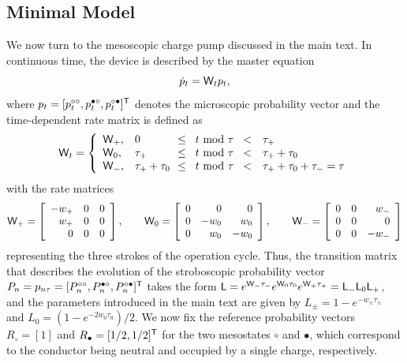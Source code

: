 \documentclass[aps,prl,reprint]{revtex4-2}
\begin{document}
\subsection{Minimal Model}

We now turn to the mesoscopic charge pump discussed in the main text.
In continuous time, the device is described by the master equation
\begin{equation}
\dot{p}_t = \mathsf{W}_t p_t,
\end{equation}
where $p_t = [p^{\circ\circ}_t, p^{\bullet\circ}_t, p^{\circ\bullet}_t]^{\mathsf{T}}$ denotes the microscopic probability vector and the time-dependent rate matrix is defined as
\begin{equation}
\sW_t = \left\{
\begin{array}{llll}
\sW_+, & 0      \!\! & \leq \;\; t\!\! \mod\tau \;\; < &\tau_+\\
\sW_0, & \tau_+ \!\! & \leq \;\; t\!\! \mod\tau \;\; < &\tau_+ + \tau_0\\
\sW_-, & \tau_+ +\tau_0 \!\! & \leq \;\; t\!\! \mod\tau \;\;< & \tau_++\tau_0+\tau_- = \tau
\end{array}
\right.
\end{equation}
with the rate matrices
\begin{equation}
\mathsf{W}_+= \left[
\begin{array}{rrr}
- w_+ & 0 & 0\\
w_+ & 0 & 0\\
0   & 0 & 0
\end{array}
\right], \qquad
\mathsf{W}_0= \left[
\begin{array}{rrr}
0 & 0 & 0\\
0 & -w_0 &  w_0\\
0 &  w_0 & -w_0
\end{array}
\right], \qquad
\mathsf{W}_-= \left[
\begin{array}{rrr}
0 & 0 & w_-\\
0 & 0 & 0\\
0 & 0 & -w_-
\end{array}
\right]
\end{equation}
representing the three strokes of the operation cycle.
Thus, the transition matrix that describes the evolution of the stroboscopic probability vector $P_n = p_{n\tau} = [P^{\circ\circ}_n, P^{\bullet\circ}_n, P^{\circ\bullet}_n]^{\mathsf{T}}$ takes the form $\mathsf{L} = e^{\mathsf{W}_-\tau_-}e^{\mathsf{W}_0\tau_0}e^{\mathsf{W}_+\tau_+} = \mathsf{L}_-\mathsf{L}_0\mathsf{L}_+$, and the parameters introduced in the main text are given by $L_\pm= 1 -e^{-w_\pm\tau_\pm}$ and $L_0 = (1-e^{-2w_0\tau_0})/2$.
We now fix the reference probability vectors $R_\circ = [1]$ and $R_\bullet = [1/2,1/2]^{\mathsf{T}}$ for the two mesostates $\circ$ and $\bullet$, which correspond to the conductor being neutral and occupied by a single charge, respectively.
\end{document}

